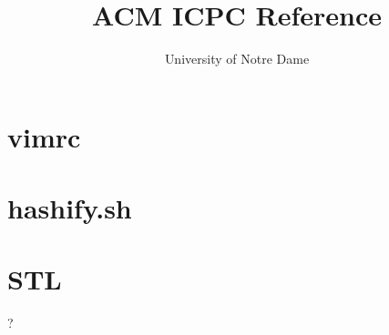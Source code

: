 \documentclass[a4paper,oneside]{article}
\title{ACM ICPC Reference}
\author{University of Notre Dame}
\begin{document}
\maketitle
\thispagestyle{fancy}
\tableofcontents
\newpage

\section{vimrc}


\section{hashify.sh}


\section{STL}
?
\end{document}
